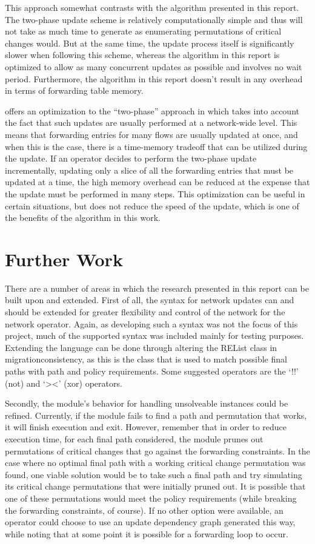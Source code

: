 \documentclass[pageno]{jpaper}
\begin{document}
This approach somewhat contrasts with the algorithm presented in this report. The two-phase update scheme is relatively computationally simple and thus will not take as much time to generate as enumerating permutations of critical changes would. But at the same time, the update process itself is significantly slower when following this scheme, whereas the algorithm in this report is optimized to allow as many concurrent updates as possible and involves no wait period. Furthermore, the algorithm in this report doesn't result in any overhead in terms of forwarding table memory.

\cite{katta13} offers an optimization to the ``two-phase'' approach in \cite{reitblatt12} which takes into account the fact that such updates are usually performed at a network-wide level. This means that forwarding entries for many flows are usually updated at once, and when this is the case, there is a time-memory tradeoff that can be utilized during the update. If an operator decides to perform the two-phase update incrementally, updating only a slice of all the forwarding entries that must be updated at a time, the high memory overhead can be reduced at the expense that the update must be performed in many steps. This optimization can be useful in certain situations, but does not reduce the speed of the update, which is one of the benefits of the algorithm in this work.

\section{Further Work}
\label{sec:furtherwork}
There are a number of areas in which the research presented in this report can be built upon and extended. First of all, the syntax for network updates can and should be extended for greater flexibility and control of the network for the network operator. Again, as developing such a syntax was not the focus of this project, much of the supported syntax was included mainly for testing purposes. Extending the language can be done through altering the REList class in migration\textunderscore consistency, as this is the class that is used to match possible final paths with path and policy requirements. Some suggested operators are the `!!' (not) and `><' (xor) operators.

Secondly, the module's behavior for handling unsolveable instances could be refined. Currently, if the module fails to find a path and permutation that works, it will finish execution and exit. However, remember that in order to reduce execution time, for each final path considered, the module prunes out permutations of critical changes that go against the forwarding constraints. In the case where no optimal final path with a working critical change permutation was found, one viable solution would be to take such a final path and try simulating its critical change permutations that were initially pruned out. It is possible that one of these permutations would meet the policy requirements (while breaking the forwarding constraints, of course). If no other option were available, an operator could choose to use an update dependency graph generated this way, while noting that at some point it is possible for a forwarding loop to occur.
\end{document}
